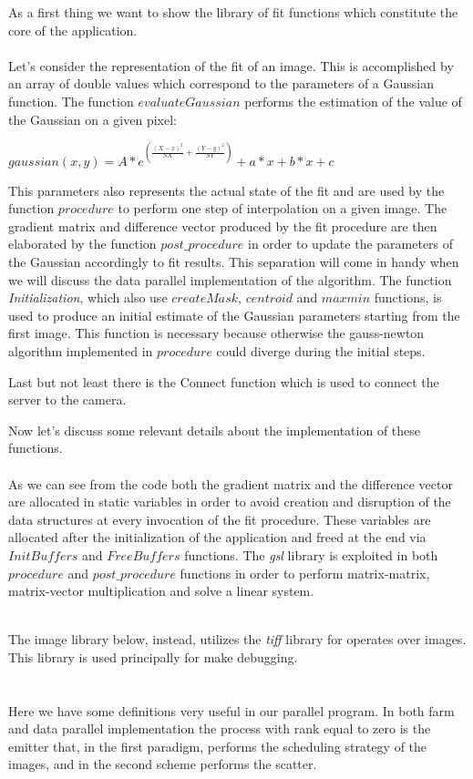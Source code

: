 As a first thing we want to show the library of fit functions which constitute the core of the application.
\ \\


\ \\Let's consider the representation of the fit of an image.
This is accomplished by an array of double values which correspond to the parameters of a Gaussian function.
The function $evaluateGaussian$ performs the estimation of the value of the Gaussian on a given pixel:
\begin{center}
	$gaussian(x,y) = A * e^{( \frac{(X-x)^2}{SX} + \frac{(Y-y)^2}{SY} )} +a*x +b*x +c$
\end{center} 
This parameters also represents the actual state of the fit and are used by the function $procedure$ to perform one step of interpolation on a given image.
The gradient matrix and difference vector produced by the fit procedure are then elaborated by the function $post\_procedure$ in order to update the parameters of the Gaussian accordingly to fit results.
This separation will come in handy when we will discuss the data parallel implementation of the algorithm.
The function \textit{Initialization}, which also use $createMask$, $centroid$ and $maxmin$ functions, is used to produce an initial estimate of the Gaussian parameters starting from the first image.
This function is necessary because otherwise the gauss-newton algorithm implemented in $procedure$ could diverge during the initial steps.

Last but not least there is the Connect function which is used to connect the server to the camera.

Now let's discuss some relevant details about the implementation of these functions.
\ \\


\ \\As we can see from the code both the gradient matrix and the difference vector are allocated in static variables in order to avoid creation and disruption of the data structures at every invocation of the fit procedure. 
These variables are allocated after the initialization of the application and freed at the end via $InitBuffers$ and $FreeBuffers$ functions.
The \textit{gsl} library is exploited in both $procedure$ and $post\_procedure$ functions in order to perform matrix-matrix, matrix-vector multiplication and solve a linear system.

\ \\The image library below, instead, utilizes the \textit{tiff} library for operates over images. This library is used principally for make debugging.
\ \\

\ \\

\ \\
Here we have some definitions very useful in our parallel program. In both farm and data parallel implementation the process with rank equal to zero is the emitter that, in the first paradigm, performs the scheduling strategy of the images, and in the second scheme performs the scatter.

